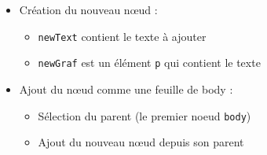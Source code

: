 \begin{english}

\begin{Shaded}
\begin{Highlighting}[]
 \NormalTok{() \{}
     \OperatorTok{=} \NormalTok{(}\NormalTok{)}\OperatorTok{;}
     \OperatorTok{=} \OperatorTok{;}

     \OperatorTok{=} \NormalTok{(}\NormalTok{)}\OperatorTok{;}
\OperatorTok{;}

     \OperatorTok{=} \NormalTok{(}\NormalTok{)[}\NormalTok{]}\OperatorTok{;}
\OperatorTok{;}
\NormalTok{\}}
\end{Highlighting}
\end{Shaded}

\end{english}

\begin{itemize}
\tightlist
\item
  Création du nouveau nœud :

  \begin{itemize}
  \tightlist
  \item
    \textenglish{\texttt{newText}} contient le texte à ajouter
  \item
    \textenglish{\texttt{newGraf}} est un élément
    \textenglish{\texttt{p}} qui contient le texte
  \end{itemize}
\item
  Ajout du nœud comme une feuille de body :

  \begin{itemize}
  \tightlist
  \item
    Sélection du parent (le premier noeud \textenglish{\texttt{body}})
  \item
    Ajout du nouveau nœud depuis son parent
  \end{itemize}
\end{itemize}

